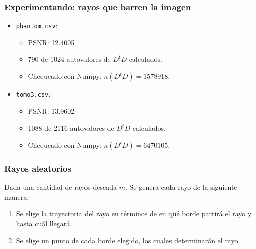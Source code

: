 \documentclass{beamer}
\begin{document}
\begin{frame}
\frametitle{Experimentando: rayos que barren la imagen}

\begin{itemize}
\item \texttt{phantom.csv}:
\begin{itemize}
\item PSNR: 12.4005
\item 790 de 1024 autovalores de $D^tD$ calculados.
\item Chequeado con Numpy: $\kappa(D^tD) = 1578918$.
\end{itemize}
\item \texttt{tomo3.csv}:
\begin{itemize}
\item PSNR: 13.9602
\item 1088 de 2116 autovalores de $D^tD$ calculados.
\item Chequeado con Numpy: $\kappa(D^tD) = 6470105$.
\end{itemize}
\end{itemize}

\end{frame}

\begin{frame}
\frametitle{Rayos aleatorios}
Dada una cantidad de rayos deseada $m$. Se genera cada rayo de la siguiente manera:
\begin{enumerate}
	\item<1-> [1.] Se elige la trayectoria del rayo en términos de en qué borde partirá el rayo y hasta cuál llegará.
	\item<2-> [2.] Se elige un punto de cada borde elegido, los cuales determinarán el rayo.
\end{enumerate}
\end{frame}
\end{document}
